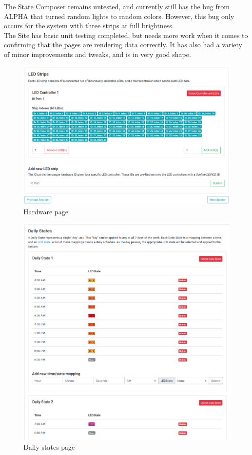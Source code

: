 \documentclass[onecolumn, draftclsnofoot,10pt, compsoc]{IEEEtran}
\begin{document}
	The State Composer remains untested, and currently still has the bug from ALPHA that turned random lights to random colors. However, this bug only
	occurs for the system with three strips at full brightness.
	\\
	The Site has basic unit testing completed, but needs more work when it comes to confirming that the pages are rendering data correctly.
	It has also had a variety of minor improvements and tweaks, and is in very good shape.
	\begin{center}
		\begin{figure}[H]
			\includegraphics[width=\linewidth]{site/hardware.png}
			\caption{Hardware page}
			\label{fig:siteHardware}
		\end{figure}
	\end{center}
	\begin{center}
		\begin{figure}[H]
			\includegraphics[width=\linewidth]{site/daily_states.png}
			\caption{Daily states page}
			\label{fig:siteDailyStates}
		\end{figure}
	\end{center}
\end{document}
